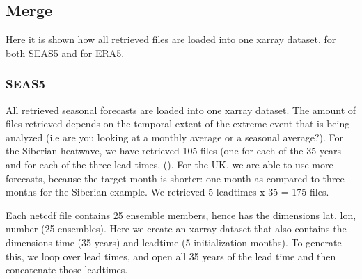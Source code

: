 \documentclass[letterpaper,10pt,english]{sphinxmanual}
\begin{document}
\subsection{Merge}
\label{\detokenize{Notebooks/2.Preprocess/2.Preprocess:Merge}}
Here it is shown how all retrieved files are loaded into one xarray dataset, for both SEAS5 and for ERA5.


\subsubsection{SEAS5}
\label{\detokenize{Notebooks/2.Preprocess/2.Preprocess:SEAS5}}
All retrieved seasonal forecasts are loaded into one xarray dataset. The amount of files retrieved depends on the temporal extent of the extreme event that is being analyzed (i.e are you looking at a monthly average or a seasonal average?). For the Siberian heatwave, we have retrieved 105 files (one for each of the 35 years and for each of the three lead times, ({\hyperref[\detokenize{Notebooks/1.Download/1.Retrieve::doc}]{}}). For the UK, we are able to use more forecasts, because the target month is shorter:
one month as compared to three months for the Siberian example. We retrieved 5 leadtimes x 35 = 175 files.

Each netcdf file contains 25 ensemble members, hence has the dimensions lat, lon, number (25 ensembles). Here we create an xarray dataset that also contains the dimensions time (35 years) and leadtime (5 initialization months). To generate this, we loop over lead times, and open all 35 years of the lead time and then concatenate those leadtimes.

{
\begin{sphinxVerbatim}[commandchars=\\\{\}]
\llap{\color{nbsphinxin}[1]:\,\hspace{\fboxrule}\hspace{\fboxsep}}
   
  
\end{sphinxVerbatim}
}
\end{document}
